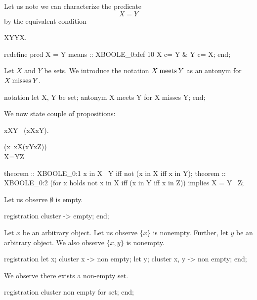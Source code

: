 \begin{paracol}{2}
\switchcolumn*\ensurevspace{5cm}
\noindent Let us note we can characterize the predicate
\[ X = Y \]
by the equivalent condition
\begin{definition}
X\subset Y\land Y\subset X.
\end{definition}
\switchcolumn
\begin{mizar}
  redefine pred X = Y
  means :: XBOOLE_0:def 10
  X c= Y & Y c= X;
end;
\end{mizar}

\switchcolumn*\ensurevspace{5cm}
Let $X$ and $Y$ be sets. We introduce the notation $X\mathbin{\text{meets}} Y$ as an
antonym for $X\mathbin{\text{misses}} Y$.
\switchcolumn
\begin{mizar}
notation
  let X, Y be set;
  antonym X meets Y for X misses Y;
end;
\end{mizar}

\switchcolumn*\ensurevspace{5cm}
We now state couple of propositions:
\begin{theorem}
x\in X\dotminus Y \iff\ \neg(x\in X\iff x\in Y).
\end{theorem}
\begin{theorem+}
(\forall x\holds\ \neg x\in X\iff (x\in Y\iff x\in Z))\\
\implies X=Y\dotminus Z
\end{theorem+}
\switchcolumn
\begin{mizar}
theorem :: XBOOLE_0:1
 x in X \+\ Y
 iff not (x in X iff x in Y);
theorem :: XBOOLE_0:2
 (for x holds not x in X
              iff (x in Y iff x in Z))
  implies X = Y \+\ Z;
\end{mizar}

\switchcolumn*\ensurevspace{5cm}
Let us observe $\emptyset$ is empty.
\switchcolumn
\begin{mizar}
registration
  cluster {} -> empty;
end;
\end{mizar}

\switchcolumn*\ensurevspace{5cm}
Let $x$ be an arbitrary object. Let us observe $\{x\}$ is nonempty.
Further, let $y$ be an arbitrary object. We also observe $\{x,y\}$ is
nonempty. 
\switchcolumn
\begin{mizar}
registration
  let x;
  cluster { x } -> non empty;
  let y;
  cluster { x, y } -> non empty;
end;
\end{mizar}

\switchcolumn*\ensurevspace{5cm}
We observe there exists a non-empty set.
\switchcolumn
\begin{mizar}
registration
  cluster non empty for set;
end;
\end{mizar}


\end{paracol}
